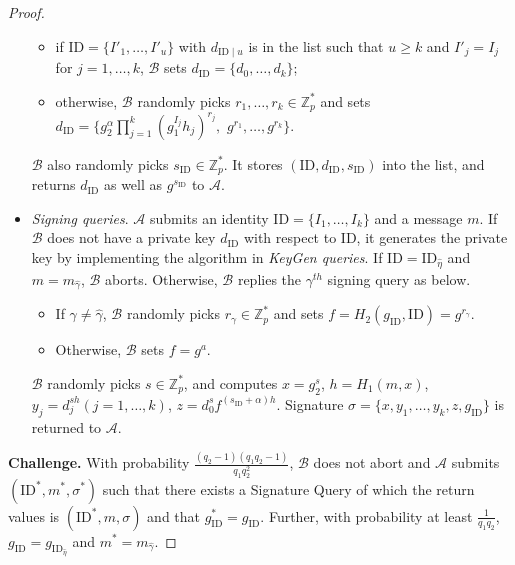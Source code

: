 \documentclass[times]{secauth}
\theoremstyle{definition}
\theoremstyle{remark}
\begin{document}
\begin{proof}
\begin{itemize}
\begin{itemize}
		\item if $\mathrm{ID} = \{I'_1, \ldots, I'_u\}$ with $d_{\mathrm{ID}\mid u}$ is in the list such that $u \geqslant k$ and $I'_j = I_j$ for $j = 1, \ldots, k$, $\mathcal{B}$ sets $d_{\mathrm{ID}} = \{d_0, \ldots, d_k\}$;
		\item otherwise, $\mathcal{B}$ randomly picks $r_1, \ldots, r_k \in \mathbb{Z}_p^*$ and sets $d_{\mathrm{ID}} = \{g_2^\alpha \prod^k_{j=1}(g_1^{I_j}h_j)^{r_j},$ $ g^{r_1}, \ldots, g^{r_k}\}$. 
	\end{itemize}
	$\mathcal{B}$ also randomly picks $s_\mathrm{ID} \in \mathbb{Z}_p^*$. 
	It stores $(\mathrm{ID}, d_\mathrm{ID}, s_\mathrm{ID})$ into the list, and returns $d_{\mathrm{ID}}$ as well as $g^{s_\mathrm{ID}}$ to $\mathcal{A}$.
	\item \emph{Signing queries}. 
	$\mathcal{A}$ submits an identity $\mathrm{ID} = \{I_1, \ldots, I_k\}$ and a message $m$.
	If $\mathcal{B}$ does not have a private key $d_{\mathrm{ID}}$ with respect to ID, it generates the private key by implementing the algorithm in \emph{KeyGen queries}. 
If $\mathrm{ID} = \mathrm{ID}_{\hat{\eta}}$ and $m = m_{\hat{\gamma}}$, $\mathcal{B}$ aborts.
	Otherwise, $\mathcal{B}$ replies the $\gamma^{th}$ signing query as below.
	\begin{itemize}
		\item If $\gamma \neq \hat{\gamma}$, $\mathcal{B}$ randomly picks $r_\gamma \in \mathbb{Z}^*_p$ and sets $f = H_2(g_\mathrm{ID}, \mathrm{ID}) = g^{r_\gamma}$. 
		\item Otherwise, $\mathcal{B}$ sets $f = g^a$.
	\end{itemize}
	$\mathcal{B}$ randomly picks $s \in \mathbb{Z}_p^*$, and computes $x = g_2^s$, $h = H_1(m, x)$, $y_j = d_j^{sh} (j = 1,\ldots, k)$, $z= d_0^{s} f^{(s_\mathrm{ID}+\alpha)h}$.
	Signature $\sigma = \{x, y_1, \ldots, y_k, z, g_{\mathrm{ID}}\}$ is returned to $\mathcal{A}$.
	\end{itemize}
\textbf{Challenge.}
With probability $\frac{(q_2-1)(q_1q_2-1)}{q_1q_2^2}$, $\mathcal{B}$ does not abort and $\mathcal{A}$ submits $(\mathrm{ID}^*, m^*, \sigma^*)$ such that there exists a Signature Query of which the return values is $(\mathrm{ID^*}, m, \sigma)$ and that $g_{\mathrm{ID}}^* = g_{\mathrm{ID}}$. 
Further, with probability at least $\frac{1}{q_1q_2}$, $g_{\mathrm{ID}} = g_{\mathrm{ID}_{\hat{\eta}}}$ and $m^* = m_{\hat{\gamma}}$.

\end{proof}
\end{document}
